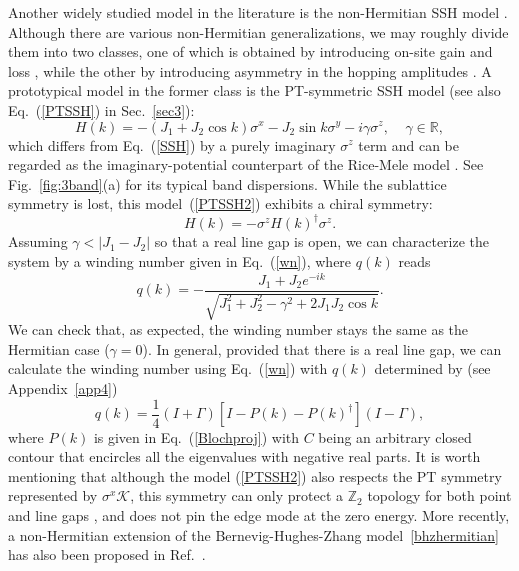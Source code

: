 \documentclass{tADP2e}
\theoremstyle{plain}
\theoremstyle{plain}
\theoremstyle{definition}
\begin{document}
Another widely studied model in the literature is the non-Hermitian SSH model \cite{LS18}. Although there are various non-Hermitian generalizations, we may roughly divide them into two classes, one of which is obtained by introducing on-site gain and loss \cite{RMS09}, while the other  by introducing asymmetry in the hopping amplitudes \cite{LTE16}. 
A prototypical model in the former class is the PT-symmetric SSH model (see also Eq.~(\ref{PTSSH}) in Sec.~\ref{sec3}):
\begin{equation}
H(k)=-(J_1+J_2\cos k)\sigma^x-J_2\sin k\sigma^y-i\gamma\sigma^z,\;\;\;\;\gamma\in\mathbb{R},
\label{PTSSH2}
\end{equation}
which differs from Eq.~(\ref{SSH}) by a purely imaginary $\sigma^z$ term and can be regarded as the imaginary-potential counterpart of the Rice-Mele model \cite{RMJ82}. See Fig.~\ref{fig:3band}(a) for its typical band dispersions. While the sublattice symmetry is lost, this model~(\ref{PTSSH2}) exhibits a chiral symmetry: 
\begin{equation}
H(k)=-\sigma^zH(k)^\dag \sigma^z.
\end{equation}
Assuming $\gamma<|J_1-J_2|$ so that a real line gap is open, we can characterize the system by a winding number given in Eq.~(\ref{wn}), where $q(k)$ reads
\begin{equation}
q(k)=-\frac{J_1+J_2e^{-ik}}{\sqrt{J_1^2+J_2^2-\gamma^2+2J_1J_2\cos k}}.
\end{equation}
We can check that, as expected, the winding number %
stays the same as the Hermitian case ($\gamma=0$). In general, provided that there is a real line gap, we can calculate the winding number using Eq.~(\ref{wn}) with $q(k)$ determined by (see Appendix~\ref{app4})
\begin{equation}
q(k)=\frac{1}{4}(I+\Gamma)[I-P(k)-P(k)^\dag](I-\Gamma),
\end{equation}
where $P(k)$ is given in Eq.~(\ref{Blochproj}) with $C$ being an arbitrary closed contour that encircles all the eigenvalues with negative real parts.  
It is worth mentioning that although the model (\ref{PTSSH2}) also respects the PT symmetry represented by $\sigma^x\mathcal{K}$, this symmetry can only protect a $\mathbb{Z}_2$ topology for both point and line gaps \cite{ZG18}, and does not pin the edge mode at the zero energy. More recently, a non-Hermitian extension of the Bernevig-Hughes-Zhang model~\eqref{bhzhermitian} has also been proposed in Ref.~\cite{SK192}.
\end{document}
